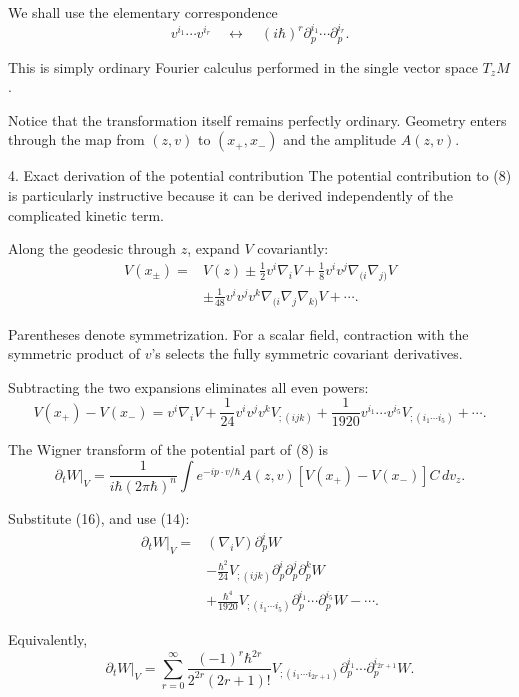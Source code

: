 We shall use the elementary correspondence
\[
\boxed{
v^{i_1}\cdots v^{i_r}
\quad\longleftrightarrow\quad
(i\hbar)^r
\partial_p^{i_1}\cdots\partial_p^{i_r}.
}
\tag{14}
\]

This is simply ordinary Fourier calculus performed in the single vector space \(T_zM\).

Notice that the transformation itself remains perfectly ordinary. Geometry enters through the map from \((z,v)\) to \((x_+,x_-)\) and the amplitude \(A(z,v)\).

4. Exact derivation of the potential contribution
The potential contribution to (8) is particularly instructive because it can be derived independently of the complicated kinetic term.

Along the geodesic through \(z\), expand \(V\) covariantly:
\[
\begin{aligned}
V(x_\pm)
={}&V(z)
\pm\frac12v^i\nabla_iV
+\frac18v^iv^j\nabla_{(i}\nabla_{j)}V\\
&\pm\frac1{48}v^iv^jv^k
\nabla_{(i}\nabla_j\nabla_{k)}V+\cdots.
\end{aligned}
\tag{15}
\]

Parentheses denote symmetrization. For a scalar field, contraction with the symmetric product of \(v\)'s selects the fully symmetric covariant derivatives.

Subtracting the two expansions eliminates all even powers:
\[
\boxed{
V(x_+)-V(x_-)
=
v^i\nabla_iV
+
\frac1{24}v^iv^jv^kV_{;(ijk)}
+
\frac1{1920}v^{i_1}\cdots v^{i_5}
V_{;(i_1\cdots i_5)}
+\cdots.
}
\tag{16}
\]

The Wigner transform of the potential part of (8) is
\[
\left.\partial_tW\right|_V
=
\frac1{i\hbar(2\pi\hbar)^n}
\int
e^{-ip\cdot v/\hbar}
A(z,v)[V(x_+)-V(x_-)]C\,dv_z.
\tag{17}
\]

Substitute (16), and use (14):
\[
\boxed{
\begin{aligned}
\left.\partial_tW\right|_V
={}&
(\nabla_iV)\partial_p^iW\\
&-\frac{\hbar^2}{24}
V_{;(ijk)}
\partial_p^i\partial_p^j\partial_p^kW\\
&+\frac{\hbar^4}{1920}
V_{;(i_1\cdots i_5)}
\partial_p^{i_1}\cdots\partial_p^{i_5}W
-\cdots.
\end{aligned}
}
\tag{18}
\]

Equivalently,
\[
\boxed{
\left.\partial_tW\right|_V
=
\sum_{r=0}^{\infty}
\frac{(-1)^r\hbar^{2r}}
{2^{2r}(2r+1)!}
V_{;(i_1\cdots i_{2r+1})}
\partial_p^{i_1}\cdots
\partial_p^{i_{2r+1}}W.
}
\tag{19}
\]

